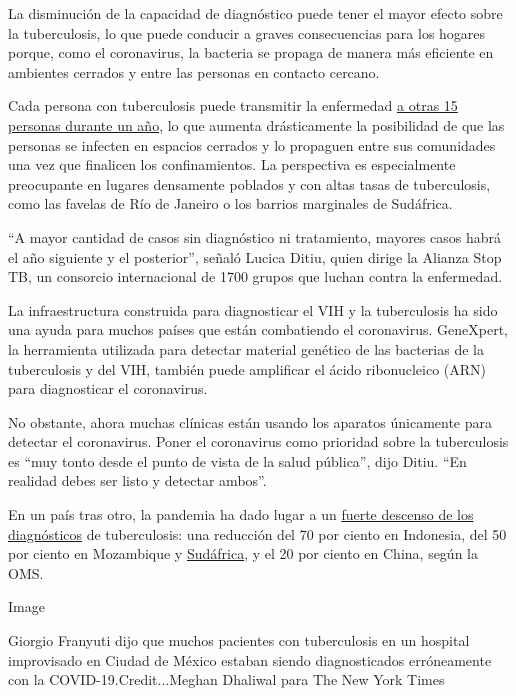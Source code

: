 La disminución de la capacidad de diagnóstico puede tener el mayor
efecto sobre la tuberculosis, lo que puede conducir a graves
consecuencias para los hogares porque, como el coronavirus, la bacteria
se propaga de manera más eficiente en ambientes cerrados y entre las
personas en contacto cercano.

Cada persona con tuberculosis puede transmitir la enfermedad
\href{https://www.who.int/es/news-room/fact-sheets/detail/tuberculosis}{a
otras 15 personas durante un año}, lo que aumenta drásticamente la
posibilidad de que las personas se infecten en espacios cerrados y lo
propaguen entre sus comunidades una vez que finalicen los
confinamientos. La perspectiva es especialmente preocupante en lugares
densamente poblados y con altas tasas de tuberculosis, como las favelas
de Río de Janeiro o los barrios marginales de Sudáfrica.

``A mayor cantidad de casos sin diagnóstico ni tratamiento, mayores
casos habrá el año siguiente y el posterior'', señaló Lucica Ditiu,
quien dirige la Alianza Stop TB, un consorcio internacional de 1700
grupos que luchan contra la enfermedad.

La infraestructura construida para diagnosticar el VIH y la tuberculosis
ha sido una ayuda para muchos países que están combatiendo el
coronavirus. GeneXpert, la herramienta utilizada para detectar material
genético de las bacterias de la tuberculosis y del VIH, también puede
amplificar el ácido ribonucleico (ARN) para diagnosticar el coronavirus.

No obstante, ahora muchas clínicas están usando los aparatos únicamente
para detectar el coronavirus. Poner el coronavirus como prioridad sobre
la tuberculosis es ``muy tonto desde el punto de vista de la salud
pública'', dijo Ditiu. ``En realidad debes ser listo y detectar ambos''.

En un país tras otro, la pandemia ha dado lugar a un
\href{https://www.medrxiv.org/content/10.1101/2020.04.28.20079582v1}{fuerte
descenso de los diagnósticos} de tuberculosis: una reducción del 70 por
ciento en Indonesia, del 50 por ciento en Mozambique y
\href{https://www.nicd.ac.za/wp-content/uploads/2020/05/Impact-of-Covid-19-interventions-on-TB-testing-in-South-Africa-10-May-2020.pdf}{Sudáfrica},
y el 20 por ciento en China, según la OMS.

Image

Giorgio Franyuti dijo que muchos pacientes con tuberculosis en un
hospital improvisado en Ciudad de México estaban siendo diagnosticados
erróneamente con la COVID-19.Credit...Meghan Dhaliwal para The New York
Times

